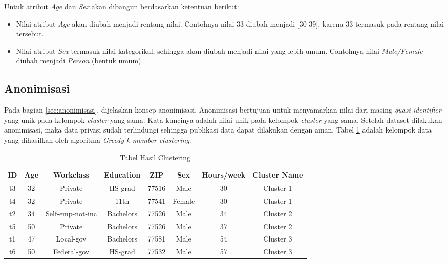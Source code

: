 \noindent Untuk atribut \textit{Age} dan \textit{Sex} akan dibangun berdasarkan ketentuan berikut: 
\begin{itemize}
\item Nilai atribut \textit{Age} akan diubah menjadi rentang nilai. Contohnya nilai 33  diubah menjadi [30-39], karena 33 termasuk pada rentang nilai tersebut.
\item Nilai atribut \textit{Sex} termasuk nilai kategorikal, sehingga akan diubah menjadi nilai yang lebih umum. Contohnya nilai \textit{Male/Female} diubah menjadi \textit{Person} (bentuk umum).
\end{itemize}





\subsection{Anonimisasi}
Pada bagian \ref{sec:anonimisasi}, dijelaskan konsep anonimisasi. Anonimisasi bertujuan untuk menyamarkan nilai dari masing \textit{quasi-identifier} yang unik pada kelompok \textit{cluster} yang sama. Kata kuncinya adalah nilai unik pada kelompok \textit{cluster} yang sama. Setelah dataset dilakukan anonimisasi, maka data privasi sudah terlindungi sehingga publikasi data dapat dilakukan dengan aman. Tabel \ref{table:clustering} adalah kelompok data yang dihasilkan oleh algoritma \textit{Greedy k-member clustering}. 
\begin{table}[H]
\centering
\caption{Tabel Hasil Clustering}
\begin{tabular}{c c c c c c c c}
\hline 
ID & Age & Workclass & Education & ZIP & Sex & Hours/week & Cluster Name\\ 
\hline 
t3 & 32 & Private & HS-grad & 77516 & Male & 30 & Cluster 1 \\ 
t4 & 32 & Private & 11th & 77541 & Female & 30 & Cluster 1 \\ 
\hline 
t2 & 34 & Self-emp-not-inc & Bachelors & 77526 & Male & 34 & Cluster 2 \\ 
t5 & 50 & Private & Bachelors & 77526 & Male & 37	& Cluster 2\\ 
\hline 
t1 & 47 & Local-gov & Bachelors & 77581 & Male & 54 & Cluster 3\\ 
t6 & 50 & Federal-gov & HS-grad & 77532 & Male & 57 & Cluster 3\\ 
\hline 
\end{tabular} 
\label{table:clustering}
\end{table}
\vspace{0.4cm}

